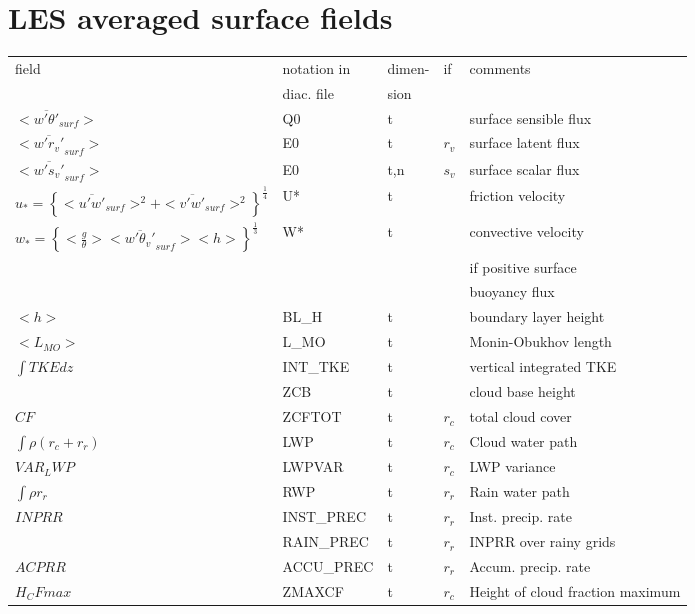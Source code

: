 \section{LES averaged surface fields}

\begin{center}
\begin{tabular}{||p{6cm}|>{\centering}p{2.5cm}|>{\centering}p{1.5cm}|>{\centering}p{0.5cm}|p{5cm }||}
\hline
\hline
field & notation in & dimen- & if    & comments \\
      & diac. file &  sion         &  & \\
\hline
\hline
$<\overline{w'\theta'}_{surf}>$ & Q0 & t & & surface sensible flux \\
\hline
$<\overline{w'r_v'}_{surf}>$ & E0 & t & $r_v$  & surface latent flux  \\
\hline
$<\overline{w's_v'}_{surf}>$ & E0 & t,n & $s_v$  & surface scalar flux  \\
\hline
$u_*=\left\{<\overline{u'w'}_{surf}>^2+<\overline{v'w'}_{surf}>^2\right\}^\frac{1}{4}$ & U* & t &   & friction velocity  \\
\hline
$w_*=\left\{<\frac{g}{\theta}><\overline{w'\theta_v'}_{surf}><h>\right\}^\frac{1}{3}$ & W* & t &   & convective velocity \\
& & & & if positive surface  \\
& & & & buoyancy flux  \\
\hline
$<h>$ & BL\_H & t &  & boundary layer height  \\
\hline
$<L_{MO}>$ & L\_MO & t &  & Monin-Obukhov length  \\
\hline
$\int{TKE}dz$ & INT\_TKE & t &  & vertical integrated TKE  \\
\hline
 & ZCB & t &  & cloud base height  \\
\hline
$CF$ & ZCFTOT & t & $r_c$ & total cloud cover   \\
\hline
$\int{\rho (r_c+r_r)}$ & LWP & t & $r_c$ & Cloud water path  \\
\hline
$VAR_LWP$ & LWPVAR & t & $r_c$ & LWP variance  \\
\hline
$\int{\rho r_r}$ & RWP & t & $r_r$ & Rain water path  \\
\hline
$INPRR$ & INST\_PREC & t & $r_r$ & Inst. precip. rate  \\
\hline
 & RAIN\_PREC & t & $r_r$ & INPRR over rainy grids  \\
\hline
$ACPRR$ & ACCU\_PREC & t & $r_r$ & Accum. precip. rate  \\
\hline
$H_CFmax$ & ZMAXCF & t & $r_c$ & Height of cloud fraction maximum  \\
\hline
\hline
\end{tabular}
\end{center}

